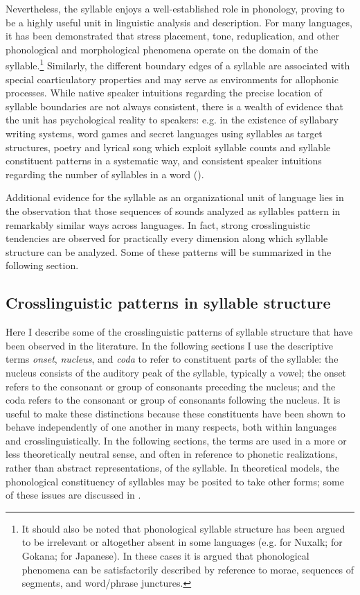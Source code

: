   Nevertheless, the syllable enjoys a well-established role in phonology, proving to be a highly useful unit in linguistic analysis and description. For many languages, it has been demonstrated that stress placement, tone, reduplication, and other phonological and morphological phenomena operate on the domain of the syllable.\footnote{{It should also be noted that phonological syllable structure has been argued to be irrelevant or altogether absent in some languages (e.g. \citealt{Newman1947} for Nuxalk; \citealt{Hyman2011,Hyman2015} for Gokana; \citealt{Labrune2012} for Japanese). In these cases it is argued that phonological phenomena can be satisfactorily described by reference to morae, sequences of segments, and word/phrase junctures.}} Similarly, the different boundary edges of a syllable are associated with special coarticulatory properties and may serve as environments for allophonic processes. While native speaker intuitions regarding the precise location of syllable boundaries are not always consistent, there is a wealth of evidence that the unit has psychological reality to speakers: e.g. in the existence of syllabary writing systems, word games and secret languages using syllables as target structures, poetry and lyrical song which exploit syllable counts and syllable constituent patterns in a systematic way, and consistent speaker intuitions regarding the number of syllables in a word (\citealt{BellHooper1978,Blevins1995,ValléeEtAl2009}).

  Additional evidence for the syllable as an organizational unit of language lies in the observation that those sequences of sounds analyzed as syllables pattern in remarkably similar ways across languages. In fact, strong crosslinguistic tendencies are observed for practically every dimension along which syllable structure can be analyzed. Some of these patterns will be summarized in the following section.

\subsection{Crosslinguistic patterns in syllable structure}\label{sec:1.1.2}

  Here I describe some of the crosslinguistic patterns of syllable structure that have been observed in the literature. In the following sections I use the descriptive terms \textit{onset}, \textit{nucleus}, and \textit{coda} to refer to constituent parts of the syllable: the nucleus consists of the auditory peak of the syllable, typically a vowel; the onset refers to the consonant or group of consonants preceding the nucleus; and the coda refers to the consonant or group of consonants following the nucleus. It is useful to make these distinctions because these constituents have been shown to behave independently of one another in many respects, both within languages and crosslinguistically. In the following sections, the terms are used in a more or less theoretically neutral sense, and often in reference to phonetic realizations, rather than abstract representations, of the syllable. In theoretical models, the phonological constituency of syllables may be posited to take other forms; some of these issues are discussed in .

